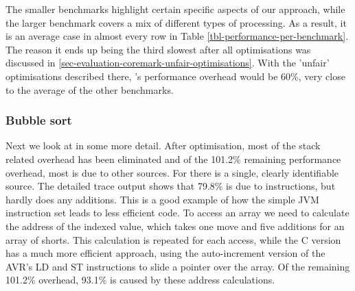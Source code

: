 The smaller benchmarks highlight certain specific aspects of our approach, while the larger  benchmark covers a mix of different types of processing. As a result, it is an average case in almost every row in Table \ref{tbl-performance-per-benchmark}. The reason it ends up being the third slowest after all optimisations was discussed in \ref{sec-evaluation-coremark-unfair-optimisations}. With the 'unfair' optimisations described there, 's performance overhead would be 60\%, very close to the average of the other benchmarks.

\subsubsection{Bubble sort}
\label{sec-evaluation-bubble-sort}
Next we look at  in some more detail. After optimisation, most of the stack related overhead has been eliminated and of the 101.2\% remaining performance overhead, most is due to other sources. For  there is a single, clearly identifiable source. The detailed trace output shows that 79.8\% is due to  instructions, but  hardly does any additions. This is a good example of how the simple JVM instruction set leads to less efficient code. To access an array we need to calculate the address of the indexed value, which takes one move and five additions for an array of shorts. This calculation is repeated for each access, while the C version has a much more efficient approach, using the auto-increment version of the AVR's LD and ST instructions to slide a pointer over the array. Of the remaining 101.2\% overhead, 93.1\% is caused by these address calculations.

%

